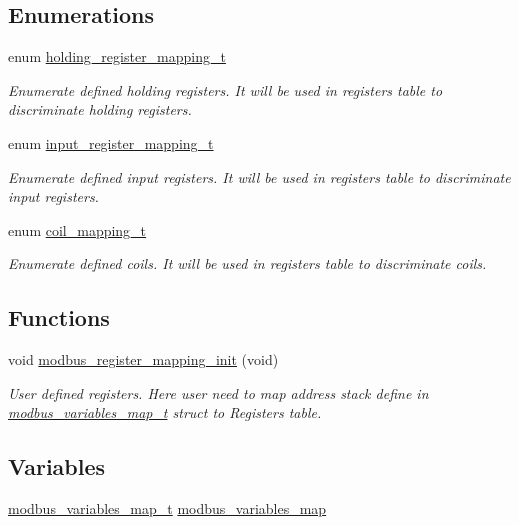 \subsection*{Enumerations}
\begin{DoxyCompactItemize}
\item 
enum \mbox{\hyperlink{group___insert_ga437be52e6b8688da8c4a21cd5adc7562}{holding\+\_\+register\+\_\+mapping\+\_\+t}} 
\begin{DoxyCompactList}\small\item\em Enumerate defined holding registers. It will be used in registers table to discriminate holding registers. \end{DoxyCompactList}\item 
enum \mbox{\hyperlink{group___insert_ga6f58928e96a62a069ae49d5970382864}{input\+\_\+register\+\_\+mapping\+\_\+t}} 
\begin{DoxyCompactList}\small\item\em Enumerate defined input registers. It will be used in registers table to discriminate input registers. \end{DoxyCompactList}\item 
enum \mbox{\hyperlink{group___insert_ga99c131df24fe52208d5876ebb4808cd1}{coil\+\_\+mapping\+\_\+t}} 
\begin{DoxyCompactList}\small\item\em Enumerate defined coils. It will be used in registers table to discriminate coils. \end{DoxyCompactList}\end{DoxyCompactItemize}
\subsection*{Functions}
\begin{DoxyCompactItemize}
\item 
void \mbox{\hyperlink{group___insert_ga6dbaaf108ca00d5dfd1037aadfc10f6f}{modbus\+\_\+register\+\_\+mapping\+\_\+init}} (void)
\begin{DoxyCompactList}\small\item\em User defined registers. Here user need to map address stack define in \mbox{\hyperlink{structmodbus__variables__map__t}{modbus\+\_\+variables\+\_\+map\+\_\+t}} struct to Registers table. \end{DoxyCompactList}\end{DoxyCompactItemize}
\subsection*{Variables}
\begin{DoxyCompactItemize}
\item 
\mbox{\hyperlink{structmodbus__variables__map__t}{modbus\+\_\+variables\+\_\+map\+\_\+t}} \mbox{\hyperlink{group___insert_gac4b2611d22ec97dbb04b0df3b535bd7b}{modbus\+\_\+variables\+\_\+map}}
\end{DoxyCompactItemize}


